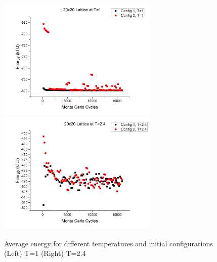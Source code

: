 \documentclass[12pt,righttag]{article}
\begin{document}
		\begin{figure}
			
			\includegraphics[width=3in]{Graph01.png}
			\includegraphics[width=3in]{Graph02.png}
			
			
			\caption{\label{Energy} Average energy for different temperatures and initial configurations (Left) T=1 (Right) T=2.4}
		\end{figure}
		
\end{document}

